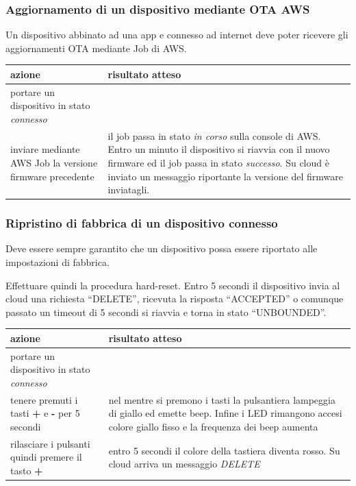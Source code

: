 \documentclass[a4paper,titlepage]{article}
\begin{document}
\subsubsection{Aggiornamento di un dispositivo mediante OTA AWS}

Un dispositivo abbinato ad una app e connesso ad internet deve poter ricevere gli
aggiornamenti OTA mediante Job di AWS.

\begin{center}
\begin{tabular}{| p{5cm} | p{5cm} |}
    \hline \textbf{azione} & \textbf{risultato atteso} \\
    \hline portare un dispositivo in stato \textit{connesso} & \\
    \hline inviare mediante AWS Job la versione firmware precedente & il job passa in stato \textit{in corso} sulla console di AWS. Entro un minuto il dispositivo si riavvia con il nuovo firmware ed il job passa in stato \textit{successo}. Su cloud è inviato un messaggio riportante la versione del firmware inviatagli. \\
    \hline
\end{tabular}
\end{center}

\subsubsection{Ripristino di fabbrica di un dispositivo connesso}
Deve essere sempre garantito che un dispositivo possa essere riportato alle impostazioni di fabbrica.

Effettuare quindi la procedura hard-reset. Entro 5 secondi il dispositivo invia al cloud una richiesta “DELETE”, ricevuta la risposta “ACCEPTED” o comunque passato un timeout di 5 secondi si riavvia e torna in stato “UNBOUNDED”.
\begin{center}
\begin{tabular}{| p{5cm} | p{5cm} |}
    \hline \textbf{azione} & \textbf{risultato atteso} \\
    \hline portare un dispositivo in stato \textit{connesso} & \\
    \hline tenere premuti i tasti \textbf{+} e \textbf{-} per 5 secondi & nel mentre si premono i tasti la pulsantiera lampeggia di giallo ed emette beep. Infine i LED rimangono accesi colore giallo fisso e la frequenza dei beep aumenta \\
    \hline rilasciare i pulsanti quindi premere il tasto \textbf{+} & entro 5 secondi il colore della tastiera diventa rosso. Su cloud arriva un messaggio \textit{DELETE} \\
    \hline
\end{tabular}
\end{center}
\end{document}
